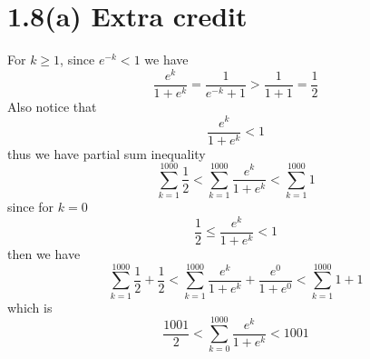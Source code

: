 \documentclass[]{article}
\begin{document}
\section *{1.8(a) Extra credit}
\par For $k\geq 1$, since $e^{-k}<1$ we have  $$\frac{e^k}{1+e^k} = \frac{1}{e^{-k}+1} > \frac{1}{1+1} = \frac{1}{2}$$ Also notice that $$\frac{e^k}{1+e^k}<1$$ thus we have partial sum inequality $$\displaystyle{\sum_{k=1}^{1000}\frac{1}{2}}<\displaystyle{\sum_{k=1}^{1000}\frac{e^k}{1+e^k}}<\displaystyle{\sum_{k=1}^{1000}1}$$ since for $k=0$ $$\frac{1}{2}\leq \frac{e^k}{1+e^k}<1$$ then we have $$\displaystyle{\sum_{k=1}^{1000}\frac{1}{2}}+\frac{1}{2}<\displaystyle{\sum_{k=1}^{1000}\frac{e^k}{1+e^k}}+\frac{e^0}{1+e^0}<\displaystyle{\sum_{k=1}^{1000}1}+1$$which is $$\frac{1001}{2}<\displaystyle{\sum_{k=0}^{1000}\frac{e^k}{1+e^k}}<1001$$
\end{document}
